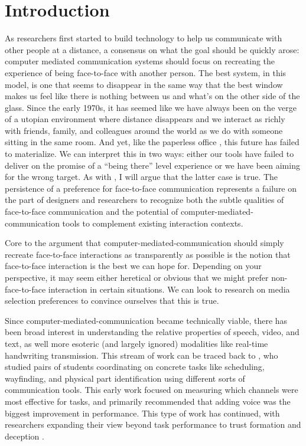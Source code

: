\chapter{Introduction}

As researchers first started to build technology to help us communicate with other people at a distance, a consensus on what the goal should be quickly arose: computer mediated communication systems should focus on recreating the experience of being face-to-face with another person. The best system, in this model, is one that seems to disappear in the same way that the best window makes us feel like there is nothing between us and what's on the other side of the glass. Since the early 1970s, it has seemed like we have always been on the verge of a utopian environment where distance disappears and we interact as richly with friends, family, and colleagues around the world as we do with someone sitting in the same room. \citep{Egido:1988vq} And yet, like the paperless office \citep{Sellen:2001uk}, this future has failed to materialize. We can interpret this in two ways: either our tools have failed to deliver on the promise of a ``being there'' level experience or we have been aiming for the wrong target. As with \citet{Hollan:1992tz}, I will argue that the latter case is true. The persistence of a preference for face-to-face communication represents a failure on the part of designers and researchers to recognize both the subtle qualities of face-to-face communication and the potential of computer-mediated-communication tools to complement existing interaction contexts.



Core to the argument that computer-mediated-communication should simply recreate face-to-face interactions as transparently as possible is the notion that face-to-face interaction is the best we can hope for. Depending on your perspective, it may seem either heretical or obvious that we might prefer non-face-to-face interaction in certain situations. We can look to research on media selection preferences to convince ourselves that this is true.

Since computer-mediated-communication became technically viable, there has been broad interest in understanding the relative properties of speech, video, and text, as well more esoteric (and largely ignored) modalities like real-time handwriting transmission. \citep{Williams:1977p682} This stream of work can be traced back to \citet{Ochsman:1974vu}, who studied pairs of students coordinating on concrete tasks like scheduling, wayfinding, and physical part identification using different sorts of communication tools. This early work focused on measuring which channels were most effective for tasks, and primarily recommended that adding voice was the biggest improvement in performance. This type of work has continued, with researchers expanding their view beyond task performance to trust formation \citep{Bos:2002p256}\citep{Toma:2010p347} and deception \citep{Hancock:2004p314}.

